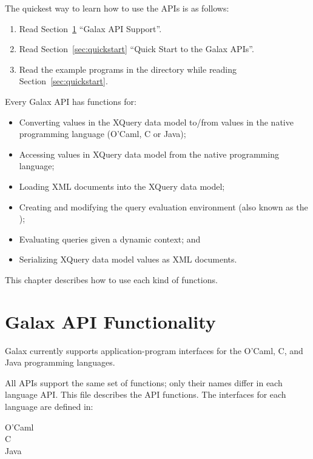 

The quickest way to learn how to use the APIs is as follows:

\begin{enumerate}
\item  Read Section~\ref{sec:apisupport} ``Galax API Support''.
\item  Read Section~\ref{sec:quickstart} ``Quick Start to the Galax APIs''.
\item  Read the example programs in the  directory
  while reading  Section~\ref{sec:quickstart}. 
\end{enumerate}

Every Galax API has functions for:
\begin{itemize}
\item Converting values in the XQuery data model to/from values in
    the native programming language (O'Caml, C or Java);

\item Accessing values in XQuery data model from the native
  programming language;

\item Loading XML documents into the XQuery data model;

\item Creating and modifying the query evaluation environment (also
    known as the );

\item Evaluating queries given a dynamic context; and 

\item Serializing XQuery data model values as XML documents.
\end{itemize}
This chapter describes how to use each kind of functions. 

\section{Galax API Functionality}
\label{sec:apisupport}

  Galax currently supports application-program interfaces for the
  O'Caml, C, and Java programming languages. 

  All APIs support the same set of functions; only their names differ
  in each language API.  This file describes the API functions.  The
  interfaces for each language are defined in:

\begin{description}
\item[O'Caml] 
\item[C]      
\item[Java]   
\end{description}

